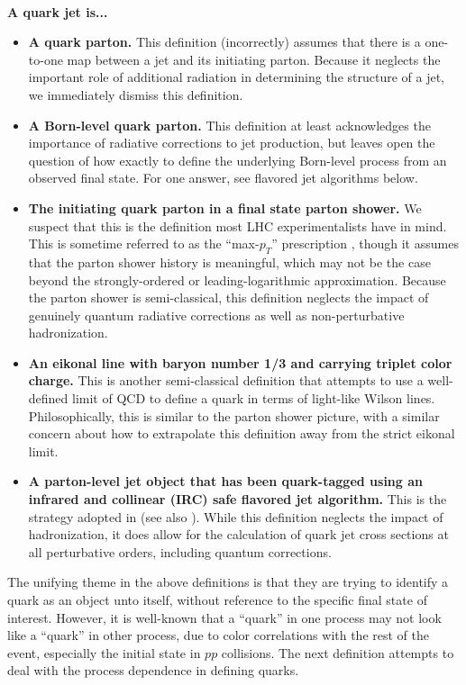 \documentclass[11pt,letterpaper]{article}
\begin{document}
~\\
\noindent \textbf{A quark jet is...}
\begin{itemize}
\item \textbf{A quark parton.}  This definition (incorrectly) assumes that there is a one-to-one map between a jet and its initiating parton.  Because it neglects the important role of additional radiation in determining the structure of a jet, we immediately dismiss this definition.
\item \textbf{A Born-level quark parton.}  This definition at least acknowledges the importance of radiative corrections to jet production, but leaves open the question of how exactly to define the underlying Born-level process from an observed final state.  For one answer, see flavored jet algorithms below.
\item \textbf{The initiating quark parton in a final state parton shower.}  We suspect that this is the definition most LHC experimentalists have in mind.  This is sometime referred to as the ``max-$p_T$'' prescription \cite{}, though it assumes that the parton shower history is meaningful, which may not be the case beyond the strongly-ordered or leading-logarithmic approximation.  Because the parton shower is semi-classical, this definition neglects the impact of genuinely quantum radiative corrections as well as non-perturbative hadronization. 
\item \textbf{An eikonal line with baryon number 1/3 and carrying triplet color charge.}  This is another semi-classical definition that attempts to use a well-defined limit of QCD to define a quark in terms of light-like Wilson lines.  Philosophically, this is similar to the parton shower picture, with a similar concern about how to extrapolate this definition away from the strict eikonal limit.
\item \textbf{A parton-level jet object that has been quark-tagged using an infrared and collinear (IRC) safe flavored jet algorithm.}  This is the strategy adopted in \cite{} (see also \cite{}).  While this definition neglects the impact of hadronization, it does allow for the calculation of quark jet cross sections at all perturbative orders, including quantum corrections.
\end{itemize}
The unifying theme in the above definitions is that they are trying to identify a quark as an object unto itself, without reference to the specific final state of interest.  However, it is well-known that a ``quark'' in one process may not look like a ``quark'' in other process, due to color correlations with the rest of the event, especially the initial state in $pp$ collisions.  The next definition attempts to deal with the process dependence in defining quarks. 
\end{document}
